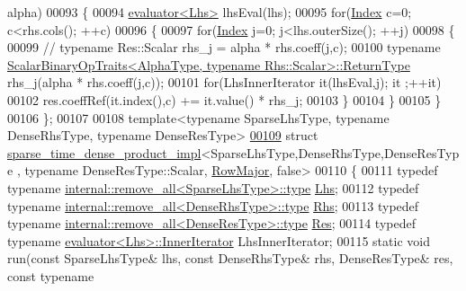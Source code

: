 \begin{DoxyCode}
      alpha)
00093   \{
00094     \hyperlink{struct_eigen_1_1internal_1_1evaluator}{evaluator<Lhs>} lhsEval(lhs);
00095     \textcolor{keywordflow}{for}(\hyperlink{namespace_eigen_a62e77e0933482dafde8fe197d9a2cfde}{Index} c=0; c<rhs.cols(); ++c)
00096     \{
00097       \textcolor{keywordflow}{for}(\hyperlink{namespace_eigen_a62e77e0933482dafde8fe197d9a2cfde}{Index} j=0; j<lhs.outerSize(); ++j)
00098       \{
00099 \textcolor{comment}{//        typename Res::Scalar rhs\_j = alpha * rhs.coeff(j,c);}
00100         \textcolor{keyword}{typename} 
      \hyperlink{group___core___module_struct_eigen_1_1_scalar_binary_op_traits}{ScalarBinaryOpTraits<AlphaType, typename Rhs::Scalar>::ReturnType}
       rhs\_j(alpha * rhs.coeff(j,c));
00101         \textcolor{keywordflow}{for}(LhsInnerIterator it(lhsEval,j); it ;++it)
00102           res.coeffRef(it.index(),c) += it.value() * rhs\_j;
00103       \}
00104     \}
00105   \}
00106 \};
00107 
00108 \textcolor{keyword}{template}<\textcolor{keyword}{typename} SparseLhsType, \textcolor{keyword}{typename} DenseRhsType, \textcolor{keyword}{typename} DenseResType>
\hyperlink{struct_eigen_1_1internal_1_1sparse__time__dense__product__impl_3_01_sparse_lhs_type_00_01_dense_14133348dce4820dcfa39d8f4e0ae837}{00109} \textcolor{keyword}{struct }\hyperlink{struct_eigen_1_1internal_1_1sparse__time__dense__product__impl}{sparse\_time\_dense\_product\_impl}<SparseLhsType,DenseRhsType,DenseResType
      , typename DenseResType::Scalar, \hyperlink{group__enums_ggaacded1a18ae58b0f554751f6cdf9eb13acfcde9cd8677c5f7caf6bd603666aae3}{RowMajor}, false>
00110 \{
00111   \textcolor{keyword}{typedef} \textcolor{keyword}{typename} \hyperlink{group___sparse_core___module}{internal::remove\_all<SparseLhsType>::type} 
      \hyperlink{group___sparse_core___module}{Lhs};
00112   \textcolor{keyword}{typedef} \textcolor{keyword}{typename} \hyperlink{group___sparse_core___module}{internal::remove\_all<DenseRhsType>::type} 
      \hyperlink{group___sparse_core___module}{Rhs};
00113   \textcolor{keyword}{typedef} \textcolor{keyword}{typename} \hyperlink{group___sparse_core___module}{internal::remove\_all<DenseResType>::type} 
      \hyperlink{group___sparse_core___module}{Res};
00114   \textcolor{keyword}{typedef} \textcolor{keyword}{typename} \hyperlink{struct_eigen_1_1internal_1_1evaluator}{evaluator<Lhs>::InnerIterator} LhsInnerIterator;
00115   \textcolor{keyword}{static} \textcolor{keywordtype}{void} run(\textcolor{keyword}{const} SparseLhsType& lhs, \textcolor{keyword}{const} DenseRhsType& rhs, DenseResType& res, \textcolor{keyword}{const} \textcolor{keyword}{typename} 

\end{DoxyCode}
